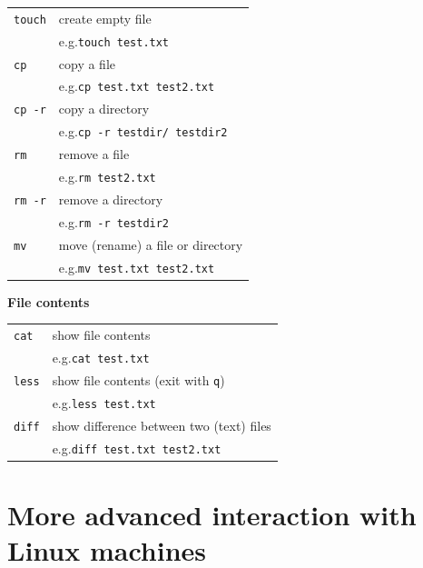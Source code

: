 \documentclass[a4paper]{article}
\begin{document}
\begin{tabular}{@{\hspace{.05\textwidth}}p{}@{}p{}@{}}
		\texttt{touch}	& create empty file	\\
										& \parbox[b]{.1\textwidth}{e.g.}\texttt{touch test.txt}	\\[5pt]
		\texttt{cp}			& copy a file	\\
										& \parbox[b]{.1\textwidth}{e.g.}\texttt{cp test.txt test2.txt}	\\[5pt]
		\texttt{cp -r}	& copy a directory	\\
										& \parbox[b]{.1\textwidth}{e.g.}\texttt{cp -r testdir/ testdir2}	\\[5pt]
		\texttt{rm}			& remove a file	\\
										& \parbox[b]{.1\textwidth}{e.g.}\texttt{rm test2.txt}	\\[5pt]
		\texttt{rm -r}	& remove a directory	\\
										& \parbox[b]{.1\textwidth}{e.g.}\texttt{rm -r testdir2}	\\[5pt]
		\texttt{mv}			& move (rename) a file or directory	\\
										& \parbox[b]{.1\textwidth}{e.g.}\texttt{mv test.txt test2.txt}	\\[5pt]
\end{tabular}
%
\par\textbf{File contents}\\[3pt]
\begin{tabular}{@{\hspace{.05\textwidth}}p{}@{}p{}@{}}
		\texttt{cat}		& show file contents	\\
										& \parbox[b]{.1\textwidth}{e.g.}\texttt{cat test.txt}	\\[5pt]
		\texttt{less}		& show file contents (exit with \texttt{q})	\\
										& \parbox[b]{.1\textwidth}{e.g.}\texttt{less test.txt}	\\[5pt]
		\texttt{diff}		& show difference between two (text) files	\\
										& \parbox[b]{.1\textwidth}{e.g.}\texttt{diff test.txt test2.txt}	\\[5pt]
\end{tabular}
%
\section{More advanced interaction with Linux machines}
%
\end{document}
